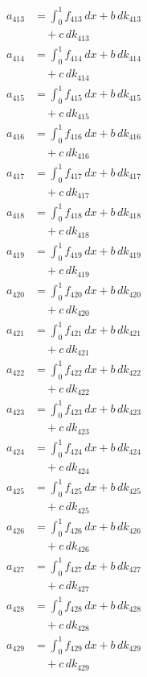 \documentclass{article}
\begin{document}
\begin{align}
a_{413} &= \int_0^1 f_{413}\,dx + b\,dk_{413} \\
&\quad + c\,dk_{413} \\
a_{414} &= \int_0^1 f_{414}\,dx + b\,dk_{414} \\
&\quad + c\,dk_{414} \\
a_{415} &= \int_0^1 f_{415}\,dx + b\,dk_{415} \\
&\quad + c\,dk_{415} \\
a_{416} &= \int_0^1 f_{416}\,dx + b\,dk_{416} \\
&\quad + c\,dk_{416} \\
a_{417} &= \int_0^1 f_{417}\,dx + b\,dk_{417} \\
&\quad + c\,dk_{417} \\
a_{418} &= \int_0^1 f_{418}\,dx + b\,dk_{418} \\
&\quad + c\,dk_{418} \\
a_{419} &= \int_0^1 f_{419}\,dx + b\,dk_{419} \\
&\quad + c\,dk_{419} \\
a_{420} &= \int_0^1 f_{420}\,dx + b\,dk_{420} \\
&\quad + c\,dk_{420} \\
a_{421} &= \int_0^1 f_{421}\,dx + b\,dk_{421} \\
&\quad + c\,dk_{421} \\
a_{422} &= \int_0^1 f_{422}\,dx + b\,dk_{422} \\
&\quad + c\,dk_{422} \\
a_{423} &= \int_0^1 f_{423}\,dx + b\,dk_{423} \\
&\quad + c\,dk_{423} \\
a_{424} &= \int_0^1 f_{424}\,dx + b\,dk_{424} \\
&\quad + c\,dk_{424} \\
a_{425} &= \int_0^1 f_{425}\,dx + b\,dk_{425} \\
&\quad + c\,dk_{425} \\
a_{426} &= \int_0^1 f_{426}\,dx + b\,dk_{426} \\
&\quad + c\,dk_{426} \\
a_{427} &= \int_0^1 f_{427}\,dx + b\,dk_{427} \\
&\quad + c\,dk_{427} \\
a_{428} &= \int_0^1 f_{428}\,dx + b\,dk_{428} \\
&\quad + c\,dk_{428} \\
a_{429} &= \int_0^1 f_{429}\,dx + b\,dk_{429} \\
&\quad + c\,dk_{429} \\

\end{align}
\end{document}
